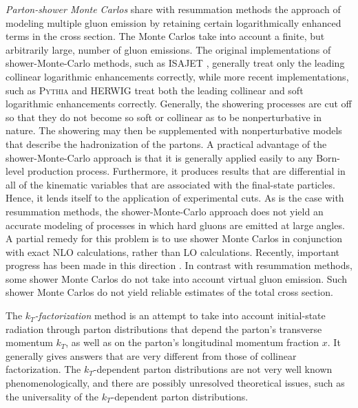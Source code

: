 {\it Parton-shower Monte Carlos} share with resummation methods the
approach of modeling multiple gluon emission by retaining certain
logarithmically enhanced terms in the cross section. The Monte Carlos
take into account a finite, but arbitrarily large, number of gluon
emissions. The original implementations of shower-Monte-Carlo methods,
such as ISAJET \cite{Paige:fb,Paige:2003mg}, generally treat only the
leading collinear logarithmic enhancements correctly, while more recent
implementations, such as \textsc{Pythia}
\cite{Sjostrand:1985ys,Sjostrand:1986hx} and HERWIG
\cite{Marchesini:1987cf,Marchesini:1991ch} treat both the leading
collinear and soft logarithmic enhancements correctly. Generally, the
showering processes are cut off so that they do not become so soft or
collinear as to be nonperturbative in nature. The showering may then be
supplemented with nonperturbative models that describe the 
hadronization of the
partons. A practical advantage of the
shower-Monte-Carlo approach is that it is generally applied easily to
any Born-level production process. Furthermore, it produces results that
are differential in all of the kinematic variables that are associated
with the final-state particles. Hence, it lends itself to the
application of experimental cuts. As is the case with resummation
methods, the shower-Monte-Carlo approach does not yield an accurate
modeling of processes in which hard gluons are emitted at large angles.
A partial remedy for this problem is to use shower Monte Carlos in
conjunction with exact NLO calculations, rather than LO calculations.
Recently, important progress has been made in this direction
\cite{Frixione:2002ik,Frixione:2002bd,Frixione:2003ei,%
Frixione:2004wy,Kramer:2003jk,Soper:2003ya}.  In contrast with
resummation methods, some shower Monte Carlos do not take into account
virtual gluon emission. Such shower Monte Carlos do not yield reliable
estimates of the total cross section.

The {\it $k_T$-factorization} method is an attempt to take into account
initial-state radiation through parton distributions that depend the
parton's transverse momentum $k_T$, as well as on the parton's
longitudinal momentum fraction $x$. It generally gives answers that are
very different from those of collinear factorization.  The
$k_T$-dependent parton distributions are not very well known
phenomenologically, and there are possibly unresolved theoretical
issues, such as the universality of the $k_T$-dependent parton
distributions.

